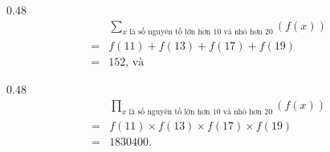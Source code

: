 {
   \begin{minipageindent}{0.48\textwidth}
      \begin{align*}
         &\sum\limits_{x \text{ là số nguyên tố lớn hơn } 10 \text{ và nhỏ hơn } 20} \left(f(x)\right) \\
         = &f(11) + f(13) + f(17) + f(19) \\
         = &152\text{, và}
      \end{align*}
   \end{minipageindent}
   \hfill
   \begin{minipageindent}{0.48\textwidth}
      \begin{align*}
         &\prod\limits_{x \text{ là số nguyên tố lớn hơn } 10 \text{ và nhỏ hơn } 20} \left(f(x)\right) \\
         = &f(11) \times f(13) \times f(17) \times f(19) \\
         = &1830400.
      \end{align*}
   \end{minipageindent}
}

